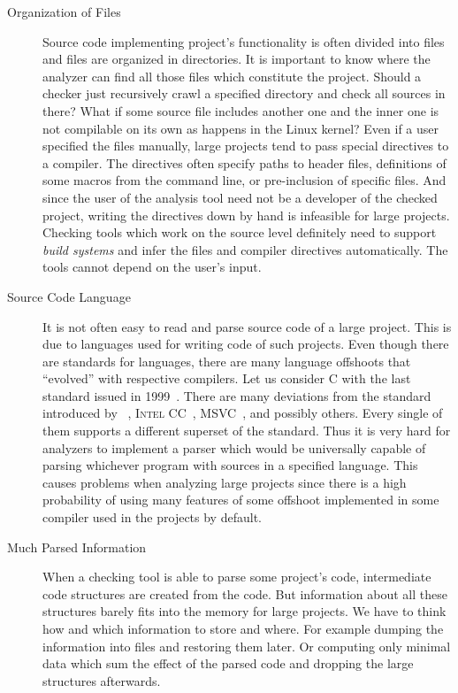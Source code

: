 \begin{description}
\item[Organization of Files] Source code implementing project's functionality
is often divided into files and files are organized in directories. It is
important to know where the analyzer can find all those files which constitute
the project.  Should a checker just recursively crawl a specified directory
and check all sources in there?  What if some source file includes another one
and the inner one is not compilable on its own as happens in the Linux kernel?
Even if a user specified the files manually, large projects tend to pass
special directives to a compiler. The directives often specify paths to header
files, definitions of some macros from the command line, or pre-inclusion of
specific files.  And since the user of the analysis tool need not be a
developer of the checked project, writing the directives down by hand is
infeasible for large projects.  Checking tools which work on the source level
definitely need to support \emph{build systems} and infer the files and
compiler directives automatically. The tools cannot depend on the user's
input.

\item[Source Code Language] It is not often easy to read and parse source
code of a large project. This is due to languages used for writing code of
such projects.  Even though there are standards for languages, there are many
language offshoots that ``evolved'' with respective compilers. Let us consider
C with the last standard issued in 1999~\cite{ansi_c}. There are many
deviations from the standard introduced by \gcc~\cite{gcc}, \textsc{Intel
CC}~\cite{intel_cc}, \textsc{MSVC}~\cite{msvc}, and possibly others.  Every
single of them supports a different superset of the standard.  Thus it is very
hard for analyzers to implement a parser which would be universally capable of
parsing whichever program with sources in a specified language. This causes
problems when analyzing large projects since there is a high probability of
using many features of some offshoot implemented in some compiler used in the
projects by default.

\item[Much Parsed Information] When a checking tool is able to parse some
project's code, intermediate code structures are created from the code. But
information about all these structures barely fits into the memory for large
projects. We have to think how and which information to store and where. For
example dumping the information into files and restoring them later. Or
computing only minimal data which sum the effect of the parsed code and
dropping the large structures afterwards.


\end{description}
